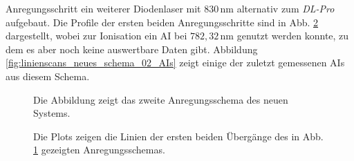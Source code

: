 Anregungsschritt ein weiterer Diodenlaser mit $830\,$nm alternativ zum
\textit{DL-Pro} aufgebaut. Die Profile der ersten beiden
Anregungsschritte sind in Abb. \ref{fig:linienscans_neues_schema_02}
dargestellt, wobei zur Ionisation ein AI bei $782,32\,$nm genutzt werden konnte,
zu dem es aber noch keine auswertbare Daten gibt. Abbildung
\ref{fig:linienscans_neues_schema_02_AIs} zeigt einige der zuletzt gemessenen
AIs aus diesem Schema.
\begin{figure}[h]
 	\centering
	\caption[Anregungsschema, neu (1)]{Die Abbildung zeigt das
	zweite Anregungsschema des neuen Systems.}\label{fig:anregungsschema_neu_02}
\end{figure}
\begin{figure}[hp]
 	\centering
 	\footnotesize
	\caption[erster und zweiter Anregungsschritt, neues System, Schema (2)]{Die
	Plots zeigen die Linien der ersten beiden Übergänge des in Abb.
	\ref{fig:anregungsschema_neu_02} gezeigten Anregungsschemas.}
	\label{fig:linienscans_neues_schema_02}
\end{figure}
